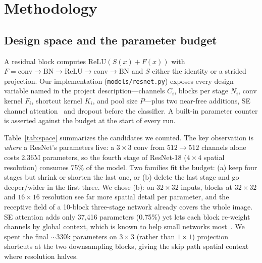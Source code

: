 \documentclass[11pt]{article}
\begin{document}
\section{Methodology}
\subsection{Design space and the parameter budget}
A residual block computes $\mathrm{ReLU}(S(x)+F(x))$ with $F=\text{conv}\to\text{BN}\to\text{ReLU}\to\text{conv}\to\text{BN}$ and $S$ either the identity or a strided projection. Our implementation (\texttt{models/resnet.py}) exposes every design variable named in the project description---channels $C_i$, blocks per stage $N_i$, conv kernel $F_i$, shortcut kernel $K_i$, and pool size $P$---plus two near-free additions, SE channel attention~\cite{hu2018} and dropout before the classifier. A built-in parameter counter is asserted against the budget at the start of every run.

Table~\ref{tab:space} summarizes the candidates we counted. The key observation is \emph{where} a ResNet's parameters live: a $3\times3$ conv from $512\to512$ channels alone costs 2.36M parameters, so the fourth stage of ResNet-18 ($4\times4$ spatial resolution) consumes 75\% of the model. Two families fit the budget: (a) keep four stages but shrink or shorten the last one, or (b) delete the last stage and go deeper/wider in the first three. We chose (b): on $32\times32$ inputs, blocks at $32\times32$ and $16\times16$ resolution see far more spatial detail per parameter, and the receptive field of a 10-block three-stage network already covers the whole image. SE attention adds only 37{,}416 parameters (0.75\%) yet lets each block re-weight channels by global context, which is known to help small networks most~\cite{hu2018}. We spent the final $\sim$330k parameters on $3\times3$ (rather than $1\times1$) projection shortcuts at the two downsampling blocks, giving the skip path spatial context where resolution halves.
\end{document}
